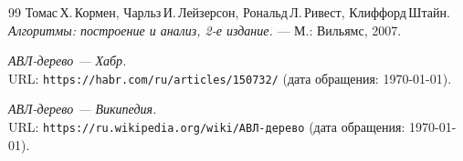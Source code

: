 \begin{thebibliography}{99}
Томас\,Х.\,Кормен, Чарльз\,И.\,Лейзерсон, Рональд\,Л.\,Ривест, Клиффорд\,Штайн.
{\itshape Алгоритмы: построение и анализ, 2-е издание.} --- М.: Вильямс, 2007.

{\itshape АВЛ-дерево — Хабр.} \\URL: \texttt{https://habr.com/ru/articles/150732/} (дата обращения: \today).

{\itshape АВЛ-дерево — Википедия.} \\URL: \texttt{https://ru.wikipedia.org/wiki/АВЛ-дерево} (дата обращения: \today).
\end{thebibliography}
\pagebreak